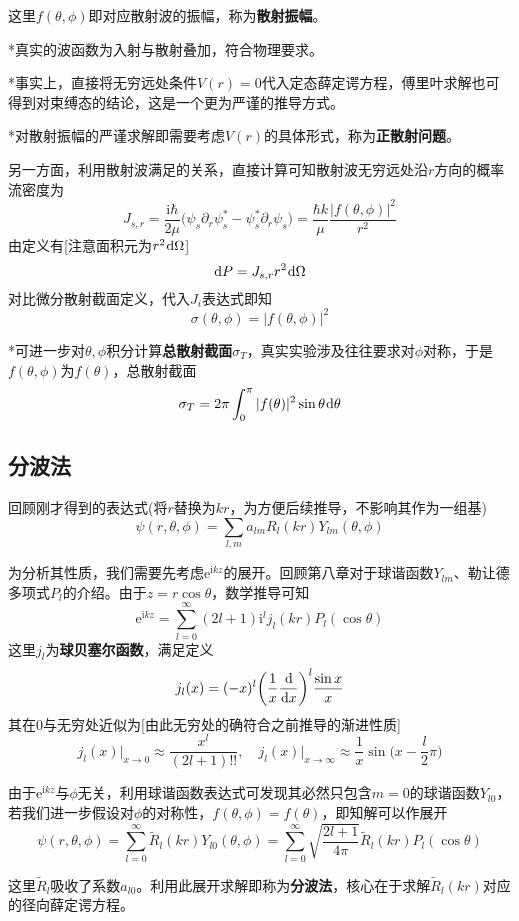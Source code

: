 \documentclass[a4paper,UTF8,fontset=windows]{ctexart}
\newcommand*{\dr}{\hspace{0.07em}\mathrm{d}}
\newcommand*{\ir}{\mathrm{i}}
\newcommand*{\er}{\mathrm{e}}
\begin{document}
这里$f(\theta,\phi)$即对应散射波的振幅，称为\textbf{散射振幅}。

*真实的波函数为入射与散射叠加，符合物理要求。

*事实上，直接将无穷远处条件$V(r)=0$代入定态薛定谔方程，傅里叶求解也可得到对束缚态的结论，这是一个更为严谨的推导方式。

*对散射振幅的严谨求解即需要考虑$V(r)$的具体形式，称为\textbf{正散射问题}。

另一方面，利用散射波满足的关系，直接计算可知散射波无穷远处沿$r$方向的概率流密度为
$$J_{s,r}=\frac{\ir\hbar}{2\mu}\big(\psi_s\partial_r\psi_s^*-\psi_s^*\partial_r\psi_s\big)=\frac{\hbar k}{\mu}\frac{|f(\theta,\phi)|^2}{r^2}$$
由定义有[注意面积元为$r^2\dr\Omega$]
$$\dr P=J_{s,r}r^2\dr\Omega$$
对比微分散射截面定义，代入$J_i$表达式即知
$$\sigma(\theta,\phi)=|f(\theta,\phi)|^2$$

*可进一步对$\theta,\phi$积分计算\textbf{总散射截面}$\sigma_T$，真实实验涉及往往要求对$\phi$对称，于是$f(\theta,\phi)$为$f(\theta)$，总散射截面
$$\sigma_T=2\pi\int_0^\pi|f(\theta)|^2\sin\theta\dr\theta$$

\subsection{分波法}
回顾刚才得到的表达式(将$r$替换为$kr$，为方便后续推导，不影响其作为一组基)
$$\psi(r,\theta,\phi)=\sum_{l,m}a_{lm}R_l(kr)Y_{lm}(\theta,\phi)$$

为分析其性质，我们需要先考虑$\er^{\ir kz}$的展开。回顾第八章对于球谐函数$Y_{lm}$、勒让德多项式$P_l$的介绍。由于$z=r\cos\theta$，数学推导可知
$$\er^{\ir kz}=\sum_{l=0}^\infty(2l+1)\ir^lj_l(kr)P_l(\cos\theta)$$
这里$j_l$为\textbf{球贝塞尔函数}，满足定义
$$j_l(x)=(-x)^l\bigg(\frac{1}{x}\frac{\dr}{\dr x}\bigg)^l\frac{\sin x}{x}$$
其在0与无穷处近似为[由此无穷处的确符合之前推导的渐进性质]
$$j_l(x)\big|_{x\to0}\approx\frac{x^l}{(2l+1)!!},\quad j_l(x)\big|_{x\to\infty}\approx\frac{1}{x}\sin\bigg(x-\frac{l}{2}\pi\bigg)$$

由于$\er^{\ir kz}$与$\phi$无关，利用球谐函数表达式可发现其必然只包含$m=0$的球谐函数$Y_{l0}$，若我们进一步假设对$\phi$的对称性，$f(\theta,\phi)=f(\theta)$，即知解可以作展开
$$\psi(r,\theta,\phi)=\sum_{l=0}^\infty\tilde{R}_l(kr)Y_{l0}(\theta,\phi)=\sum_{l=0}^\infty\sqrt{\frac{2l+1}{4\pi}}\tilde{R}_l(kr)P_l(\cos\theta)$$

这里$\tilde{R}_l$吸收了系数$a_{l0}$。利用此展开求解即称为\textbf{分波法}，核心在于求解$\tilde{R}_l(kr)$对应的径向薛定谔方程。

\
\end{document}
